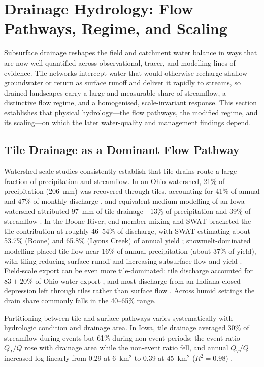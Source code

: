 \section{Drainage Hydrology: Flow Pathways, Regime, and Scaling}

Subsurface drainage reshapes the field and catchment water balance in ways that are now well quantified across observational, tracer, and modelling lines of evidence. Tile networks intercept water that would otherwise recharge shallow groundwater or return as surface runoff and deliver it rapidly to streams, so drained landscapes carry a large and measurable share of streamflow, a distinctive flow regime, and a homogenised, scale-invariant response. This section establishes that physical hydrology---the flow pathways, the modified regime, and its scaling---on which the later water-quality and management findings depend.

\subsection{Tile Drainage as a Dominant Flow Pathway}

Watershed-scale studies consistently establish that tile drains route a large fraction of precipitation and streamflow. In an Ohio watershed, 21\% of precipitation (206~mm) was recovered through tiles, accounting for 41\% of annual and 47\% of monthly discharge \parencite{King2014}, and equivalent-medium modelling of an Iowa watershed attributed 97~mm of tile drainage---13\% of precipitation and 39\% of streamflow \parencite{Thomas2016}. In the Boone River, end-member mixing and \textsc{SWAT} bracketed the tile contribution at roughly 46--54\% of discharge, with \textsc{SWAT} estimating about 53.7\% (Boone) and 65.8\% (Lyons Creek) of annual yield \parencite{Schilling2019}; snowmelt-dominated modelling placed tile flow near 16\% of annual precipitation (about 37\% of yield), with tiling reducing surface runoff and increasing subsurface flow and yield \parencite{Rahman2014}. Field-scale export can be even more tile-dominated: tile discharge accounted for $83\pm20$\% of Ohio water export \parencite{Williams2018}, and most discharge from an Indiana closed depression left through tiles rather than surface flow \parencite{Williams2019}. Across humid settings the drain share commonly falls in the 40--65\% range.

Partitioning between tile and surface pathways varies systematically with hydrologic condition and drainage area. In Iowa, tile drainage averaged 30\% of streamflow during events but 61\% during non-event periods; the event ratio $Q_T/Q$ rose with drainage area while the non-event ratio fell, and annual $Q_T/Q$ increased log-linearly from 0.29 at 6~km$^2$ to 0.39 at 45~km$^2$ ($R^2=0.98$) \parencite{Thomas2016,King2014}.

